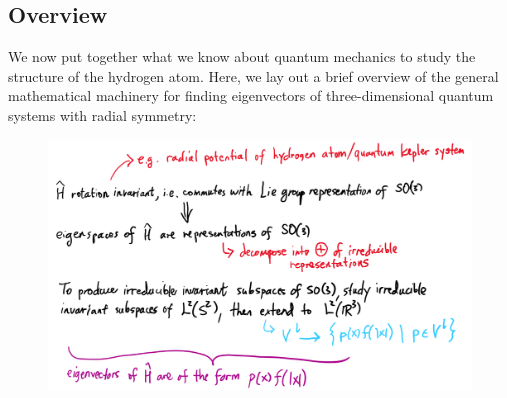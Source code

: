 \subsection{Overview}
We now put together what we know about quantum mechanics to study the structure of the hydrogen atom. Here, we lay out a brief overview of the general mathematical machinery for finding eigenvectors of three-dimensional quantum systems with radial symmetry:
\begin{figure}[ht]
    \includegraphics[width=\textwidth]{figures/quantum_kepler}
    \centering
\end{figure}
